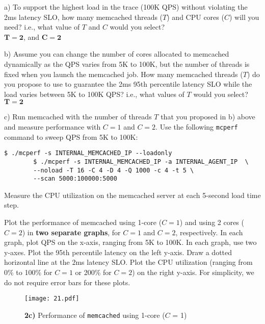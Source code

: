 \documentclass[11pt]{article}
\begin{document}
\begin{enumerate}
    a) To support the highest load in the trace (100K QPS) without violating the 2ms latency SLO, how many memcached threads ($T$) and CPU cores ($C$) will you need? i.e., what value of $T$ and $C$ would you select? \\
    

    $\mathbf{T=2}$, and $\mathbf{C=2}$


    b) Assume you can change the number of cores allocated to memcached dynamically as the QPS varies from 5K to 100K, but the number of threads is fixed when you launch the memcached job. How many memcached threads ($T$) do you propose to use to guarantee the 2ms 95th percentile latency SLO while the load varies between 5K to 100K QPS? i.e., what values of $T$ would you select? \\
    
    
    $\mathbf{T = 2}$
    
    
    c) Run memcached with the number of threads $T$ that you proposed in b) above and measure performance with $C=1$ and $C=2$. Use the following \texttt{mcperf} command to sweep QPS from 5K to 100K:
    
    \begin{Verbatim}[fontsize=\small]
        $ ./mcperf -s INTERNAL_MEMCACHED_IP --loadonly 
        $ ./mcperf -s INTERNAL_MEMCACHED_IP -a INTERNAL_AGENT_IP  \
        --noload -T 16 -C 4 -D 4 -Q 1000 -c 4 -t 5 \ 
        --scan 5000:100000:5000
    \end{Verbatim}
    
    Measure the CPU utilization on the memcached server at each 5-second load time step.
    
    Plot the performance of memcached using 1-core ($C=1$) and using 2 cores ($C=2$) in \textbf{two separate graphs}, for $C=1$ and $C=2$,  respectively. In each graph, plot QPS on the x-axis, ranging from 5K to 100K. In each graph, use two y-axes. Plot the 95th percentile latency on the left y-axis. Draw a dotted horizontal line at the 2ms latency SLO. Plot the CPU utilization (ranging from 0\% to 100\% for $C=1$ or 200\% for $C=2$) on the right y-axis. For simplicity, we do not require error bars for these plots. 
    


    \begin{figure}[!htbp]
        \centering
        \texttt{[image: 21.pdf]}
        \caption{\textbf{2c)} Performance of \texttt{memcached} using 1-core ($C$ = 1)}
        \label{fig:2}
    \end{figure} 
  

\end{enumerate}
\end{document}
